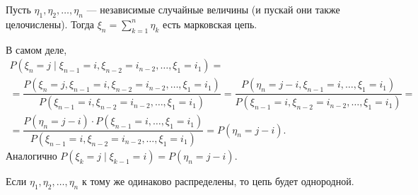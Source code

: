 \begin{ex}
  Пусть $\eta_1, \eta_2, \dots, \eta_n$ --- независимые случайные величины (и
  пускай они также целочислены). Тогда $\xi_n = \sum\limits_{k=1}^n \eta_k$ есть
  марковская цепь.

  В самом деле,
  \begin{multline*}
    P(\xi_n = j \mid \xi_{n-1} = i, \xi_{n-2} = i_{n-2}, \dots, \xi_1 = i_1)
    =\\=
    \dfrac{P(\xi_n = j, \xi_{n-1} = i, \xi_{n-2} = i_{n-2}, \dots, \xi_1 = i_1)}{P(\xi_{n-1} = i, \xi_{n-2} = i_{n-2}, \dots, \xi_1 = i_1)}
    = \dfrac{P(\eta_n = j-i, \xi_{n-1}=i, \dots, \xi_1 = i_1 )}{P(\xi_{n-1} = i, \xi_{n-2} = i_{n-2}, \dots, \xi_1 = i_1)}
    =\\= \dfrac{P(\eta_n = j-i) \cdot P(\xi_{n-1}=i, \dots, \xi_1 = i_1 )}{P(\xi_{n-1} = i, \xi_{n-2} = i_{n-2}, \dots, \xi_1 = i_1)}
    = P(\eta_n = j-i).
  \end{multline*}
  Аналогично $ P(\xi_k = j \mid \xi_{k-1} = i) = P(\eta_n = j - i) $.
\begin{remark*}
  Если $ \eta_1,\eta_2,\ldots,\eta_n $ к тому же одинаково распределены, то цепь
  будет однородной.
\end{remark*}
\end{ex}


